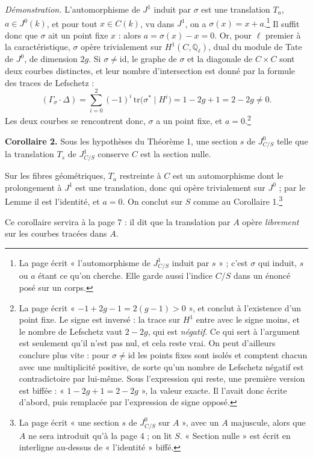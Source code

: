 \documentclass[11pt,a4paper]{article}
\begin{document}
\emph{Démonstration.} L'automorphisme de $J^{1}$ induit par $\sigma$ est une
translation $T_{a}$, $a \in J^{0}(k)$, et pour tout $x \in C(k)$, vu dans
$J^{1}$, on a $\sigma(x) = x + a$.\footnote{La page écrit « l'automorphisme de
$J^{1}_{C/S}$ induit par $s$ » ; c'est $\sigma$ qui induit, $s$ ou $a$ étant
ce qu'on cherche. Elle garde aussi l'indice $C/S$ dans un énoncé posé sur un
corps.} Il suffit donc que $\sigma$ ait un point fixe $x$ : alors
$a = \sigma(x) - x = 0$. Or, pour $\ell$ premier à la caractéristique, $\sigma$
opère trivialement sur $H^{1}(C, \mathbb{Q}_{\ell})$, dual du module de Tate de
$J^{0}$, de dimension $2g$. Si $\sigma \neq \mathrm{id}$, le graphe de $\sigma$
et la diagonale de $C \times C$ sont deux courbes distinctes, et leur nombre
d'intersection est donné par la formule des traces de Lefschetz :
\[
  (\Gamma_{\sigma} \cdot \Delta)
  = \sum_{i=0}^{2} (-1)^{i}\, \mathrm{tr}\bigl(\sigma^{*} \mid H^{i}\bigr)
  = 1 - 2g + 1 = 2 - 2g \neq 0.
\]
Les deux courbes se rencontrent donc, $\sigma$ a un point fixe, et
$a = 0$.\footnote{La page écrit « $-1 + 2g - 1 = 2(g-1) > 0$ », et conclut à
l'existence d'un point fixe. Le signe est inversé : la trace sur $H^{1}$ entre
avec le signe moins, et le nombre de Lefschetz vaut $2 - 2g$, qui est
\emph{négatif}. Ce qui sert à l'argument est seulement qu'il n'est pas nul, et
cela reste vrai. On peut d'ailleurs conclure plus vite : pour
$\sigma \neq \mathrm{id}$ les points fixes sont isolés et comptent chacun avec
une multiplicité positive, de sorte qu'un nombre de Lefschetz négatif est
contradictoire par lui-même. Sous l'expression qui reste, une première
version est biffée : « $1 - 2g + 1 = 2 - 2g$ », la valeur exacte. Il l'avait
donc écrite d'abord, puis remplacée par l'expression de signe opposé.}

\textbf{Corollaire 2.} Sous les hypothèses du Théorème 1, une section $s$ de
$J^{0}_{C/S}$ telle que la translation $T_{s}$ de $J^{1}_{C/S}$ conserve $C$
est la section nulle.

Sur les fibres géométriques, $T_{a}$ restreinte à $C$ est un automorphisme
dont le prolongement à $J^{1}$ est une translation, donc qui opère
trivialement sur $J^{0}$ ; par le Lemme il est l'identité, et $a = 0$. On
conclut sur $S$ comme au Corollaire 1.\footnote{La page écrit « une section
$s$ de $J^{0}_{C/S}$ sur $A$ », avec un $A$ majuscule, alors que $A$ ne sera
introduit qu'à la page 4 ; on lit $S$. « Section nulle » est écrit en
interligne au-dessus de « l'identité » biffé.}

Ce corollaire servira à la page 7 : il dit que la translation par
$A$ opère \emph{librement} sur les courbes tracées dans $A$.
\end{document}
